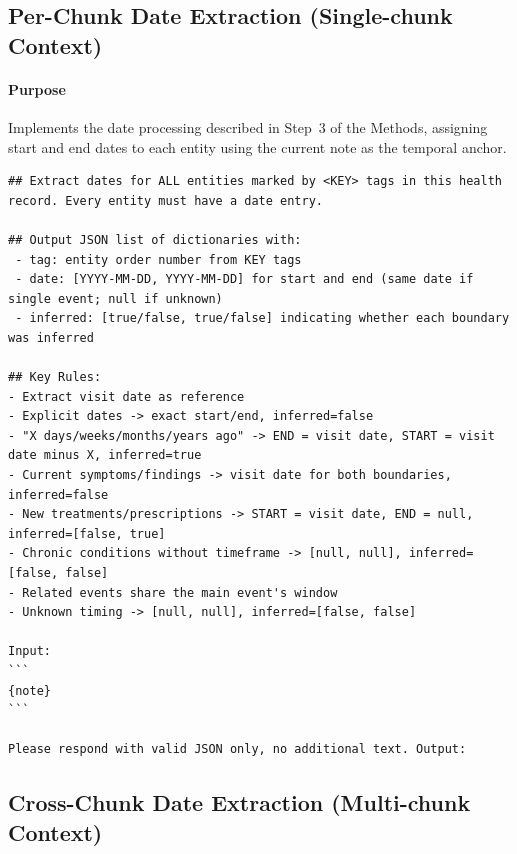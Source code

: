 \subsection{Per-Chunk Date Extraction (Single-chunk Context)}
\paragraph{Purpose} Implements the date processing described in Step~3 of the Methods, assigning start and end dates to each entity using the current note as the temporal anchor.
\begin{lstlisting}
## Extract dates for ALL entities marked by <KEY> tags in this health record. Every entity must have a date entry.

## Output JSON list of dictionaries with:
 - tag: entity order number from KEY tags
 - date: [YYYY-MM-DD, YYYY-MM-DD] for start and end (same date if single event; null if unknown)
 - inferred: [true/false, true/false] indicating whether each boundary was inferred

## Key Rules:
- Extract visit date as reference
- Explicit dates -> exact start/end, inferred=false
- "X days/weeks/months/years ago" -> END = visit date, START = visit date minus X, inferred=true
- Current symptoms/findings -> visit date for both boundaries, inferred=false
- New treatments/prescriptions -> START = visit date, END = null, inferred=[false, true]
- Chronic conditions without timeframe -> [null, null], inferred=[false, false]
- Related events share the main event's window
- Unknown timing -> [null, null], inferred=[false, false]

Input:
```
{note}
```

Please respond with valid JSON only, no additional text. Output:
\end{lstlisting}

\subsection{Cross-Chunk Date Extraction (Multi-chunk Context)}
